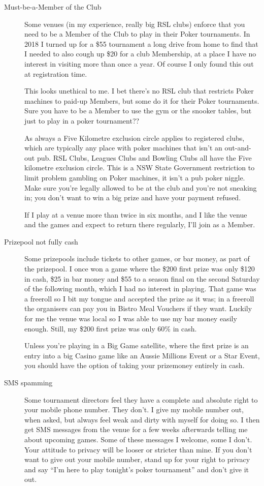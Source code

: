 \begin{description}
\item[Must-be-a-Member of the Club] Some venues (in my experience,
really big RSL clubs) enforce that you need to be a Member of the Club
to play in their Poker tournaments. In 2018 I turned up for a \$55
tournament a long drive from home to find that I needed to also cough
up \$20 for a club Membership, at a place I have no interest in visiting
more than once a year. Of course I only found this out at registration
time.

This looks unethical to me. I bet there's no RSL club that
restricts Poker machines to paid-up Members, but some do it for
their Poker tournaments. Sure you have to be a Member to use
the gym or the snooker tables, but just to play in a poker
tournament??

As always a Five Kilometre exclusion circle applies to registered
clubs, which are typically any place with poker machines that isn't an
out-and-out pub. RSL Clubs, Leagues Clubs and Bowling Clubs all have
the Five kilometre exclusion circle. This is a NSW State Government
restriction to limit problem gambling on Poker machines, it isn't a
pub poker niggle. Make sure you're legally allowed to be at the club
and you're not sneaking in; you don't want to win a big prize and have
your payment refused.

If I play at a venue more than twice in six months, and I like the
venue and the games and expect to return there regularly, I'll join as
a Member.

\item[Prizepool not fully cash] Some prizepools include tickets
to other games, or bar money, as part of the prizepool. I once won a game
where the \$200 first prize was only \$120 in cash, \$25 in bar money
and \$55 to a season final on the second Saturday of the following month,
which I had no interest in playing. That game was a freeroll so I bit
my tongue and accepted the prize as it was; in a freeroll the organisers
can pay you in Bistro Meal Vouchers if they want. Luckily for me the venue
was local so I was able to use my bar money easily enough. Still, my
\$200 first prize was only 60\% in cash.

Unless you're playing in a Big Game satellite, where the first prize
is an entry into a big Casino game like an Aussie Millions Event or a
Star Event, you should have the option of taking your prizemoney
entirely in cash.

\item[SMS spamming] Some tournament directors feel they have a
complete and absolute right to your mobile phone number. They don't.
I give my mobile number out, when asked, but always feel weak and
dirty with myself for doing so. I then get SMS messages from the venue
for a few weeks afterwards telling me about upcoming games. Some of
these messages I welcome, some I don't. Your attitude to privacy will
be looser or stricter than mine. If you don't want to give out your
mobile number, stand up for your right to privacy and say ``I'm here
to play tonight's poker tournament'' and don't give it out.


\end{description}
